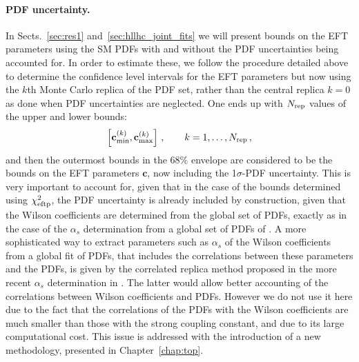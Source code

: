 \documentclass[withindex,glossary]{cam-thesis}
\begin{document}
\paragraph{PDF uncertainty.} In
Sects.~\ref{sec:res1} and~\ref{sec:hllhc_joint_fits} we
will present bounds on the EFT parameters  using the SM PDFs
with and without the PDF uncertainties being accounted for.
%
In order to estimate these, we follow the procedure detailed above to
determine the confidence level intervals for the EFT parameters but now
using the $k$th Monte Carlo replica of the PDF set, rather than the central replica $k=0$
as done when PDF uncertainties are neglected.
%
One ends up with  $N_{\rm rep}$ values of
the upper and lower bounds:
\begin{equation}
\left[{\mathbf c}^{(k)}_{\rm min},{\mathbf c}^{(k)}_{\rm max}\right] \, ,\qquad k=1,\ldots,N_{\rm rep} \, ,
\end{equation}
and then the outermost bounds in the \(68\%\) envelope are considered to be the bounds
on the EFT parameters ${\mathbf c}$, now including the 1$\sigma$-PDF uncertainty.
%
This is very important to account for, given that in the case of the
bounds determined using $\chi^2_{\rm eftp}$, the PDF
uncertainty is already included by
construction, given that the Wilson coefficients are determined from the
global set of PDFs, exactly as in the case of the $\alpha_s$
determination from a global set of PDFs of
\cite{Lionetti:2011pw,Ball:2011us}. A more sophisticated way to
extract parameters such as $\alpha_s$ of the Wilson coefficients from
a global fit of PDFs, that includes the correlations between these parameters
and the PDFs, is given by the correlated replica method proposed in the more recent $\alpha_s$ determination in
\cite{Ball:2018iqk}. The latter would allow better accounting of the correlations
between Wilson coefficients and PDFs. However we do not use it here due to the fact that the correlations of the
PDFs with the Wilson coefficients are much smaller than those with the strong
coupling constant, and due to its large computational cost. This issue is addressed with the introduction of a new
methodology, presented in Chapter~\ref{chap:top}.
\end{document}

